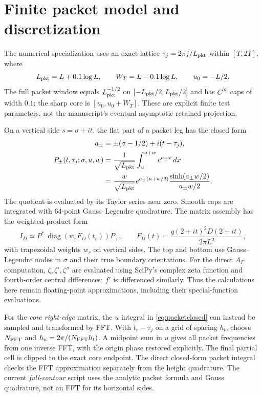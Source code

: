 \documentclass[11pt]{article}
\begin{document}
\section{Finite packet model and discretization}

The numerical specialization uses an exact lattice
$\tau_j=2\pi j/L_{\rm pkt}$ within $[T,2T]$, where
\begin{equation}
L_{\rm pkt}=L+0.1\log L,\qquad
W_T=L-0.1\log L,\qquad u_0=-L/2.
\label{eq:packetparameters}
\end{equation}
The full packet window equals $L_{\rm pkt}^{-1/2}$ on
$[-L_{\rm pkt}/2,L_{\rm pkt}/2]$ and has $C^\infty$ caps of width $0.1$;
the sharp core is $[u_0,u_0+W_T]$. These are explicit finite test parameters,
not the manuscript's eventual asymptotic retained projection.

On a vertical side $s=\sigma+it$, the flat part of a packet leg has the
closed form
\begin{equation}
\begin{aligned}
a_\pm&=\pm(\sigma-1/2)+i(t-\tau_j),\\
P_\pm(t,\tau_j;\sigma,u,w)
&=\frac1{\sqrt{L_{\rm pkt}}}\int_u^{u+w}e^{a_\pm x}\,dx\\
&=\frac{w}{\sqrt{L_{\rm pkt}}}
e^{a_\pm(u+w/2)}\frac{\sinh(a_\pm w/2)}{a_\pm w/2}.
\end{aligned}
\label{eq:packetclosed}
\end{equation}
The quotient is evaluated by its Taylor series near zero. Smooth caps are
integrated with 64-point Gauss--Legendre quadrature. The matrix assembly has
the weighted-product form
\begin{equation}
I_D\simeq P_-^*\operatorname{diag}(w_rF_D(t_r))P_+,
\qquad F_D(t)=\frac{q(2+it)^2D(2+it)}{2\pi L^2},
\label{eq:product}
\end{equation}
with trapezoidal weights $w_r$ on vertical sides. The top and bottom use
Gauss--Legendre nodes in $\sigma$ and their true boundary orientations.
For the direct $A_F$ computation, $\zeta,\zeta',\zeta''$ are evaluated using
SciPy's complex zeta function and fourth-order central differences; $f'$ is
differenced similarly. Thus the calculations here remain floating-point
approximations, including their special-function evaluations.

For the \emph{core right-edge} matrix, the $u$ integral in
\eqref{eq:packetclosed} can instead be sampled and transformed by FFT.
With $t_r-\tau_j$ on a grid of spacing $h_t$, choose $N_{\rm FFT}$ and
$h_u=2\pi/(N_{\rm FFT}h_t)$. A midpoint sum in $u$ gives all packet
frequencies from one inverse FFT, with the origin phase restored explicitly.
The final partial cell is clipped to the exact core endpoint. The direct
closed-form packet integral checks the FFT approximation separately from the
height quadrature. The current \emph{full-contour} script uses the analytic
packet formula and Gauss quadrature, not an FFT for its horizontal sides.
\end{document}
